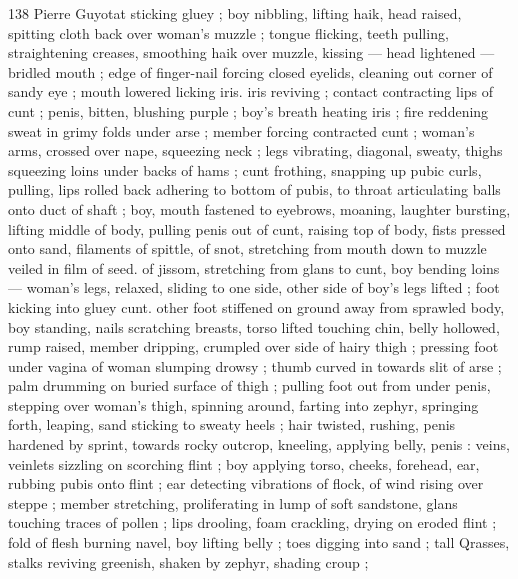 138 Pierre Guyotat
sticking gluey ; boy nibbling, lifting haik, head raised, spitting cloth
back over woman's muzzle ; tongue flicking, teeth pulling,
straightening creases, smoothing haik over muzzle, kissing — head
lightened — bridled mouth ; edge of finger-nail forcing closed
eyelids, cleaning out corner of sandy eye ; mouth lowered licking iris.
iris reviving ; contact contracting lips of cunt ; penis, bitten, blushing
purple ; boy’s breath heating iris ; fire reddening sweat in grimy folds
under arse ; member forcing contracted cunt ; woman's arms,
crossed over nape, squeezing neck ; legs vibrating, diagonal, sweaty,
thighs squeezing loins under backs of hams ; cunt frothing, snapping
up pubic curls, pulling, lips rolled back adhering to bottom of pubis,
to throat articulating balls onto duct of shaft ; boy, mouth fastened
to eyebrows, moaning, laughter bursting, lifting middle of body,
pulling penis out of cunt, raising top of body, fists pressed onto
sand, filaments of spittle, of snot, stretching from mouth down to
muzzle veiled in film of seed. of jissom, stretching from glans to
cunt, boy bending loins — woman's legs, relaxed, sliding to one
side, other side of boy's legs lifted ; foot kicking into gluey cunt.
other foot stiffened on ground away from sprawled body, boy
standing, nails scratching breasts, torso lifted touching chin, belly
hollowed, rump raised, member dripping, crumpled over side of
hairy thigh ; pressing foot under vagina of woman slumping drowsy
; thumb curved in towards slit of arse ; palm drumming on buried
surface of thigh ; pulling foot out from under penis, stepping over
woman's thigh, spinning around, farting into zephyr, springing forth,
leaping, sand sticking to sweaty heels ; hair twisted, rushing, penis
hardened by sprint, towards rocky outcrop, kneeling, applying belly,
penis : veins, veinlets sizzling on scorching flint ; boy applying torso,
cheeks, forehead, ear, rubbing pubis onto flint ; ear detecting
vibrations of flock, of wind rising over steppe ; member stretching,
proliferating in lump of soft sandstone, glans touching traces of
pollen ; lips drooling, foam crackling, drying on eroded flint ; fold of
flesh burning navel, boy lifting belly ; toes digging into sand ; tall
Qrasses, stalks reviving greenish, shaken by zephyr, shading croup ;

